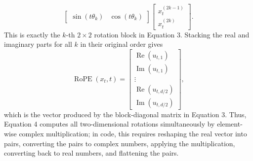 \documentclass[11pt, a4paper, oneside]{article}
\begin{document}
\begin{enumerate}[label=(\alph*), left=0pt, labelsep=1em, itemsep=1em]
\begin{enumerate}[label=\roman*., left=0pt, labelsep=1em, itemsep=1em]
\[\begin{bmatrix}
                \sin(t\theta_k)&\cos(t\theta_k)
            \end{bmatrix}
            \begin{bmatrix}
                x_t^{(2k-1)}\\
                x_t^{(2k)}
            \end{bmatrix}.
        \]
        This is exactly the $k$-th $2\times2$ rotation block in Equation 3.
        Stacking the real and imaginary parts for all $k$ in their original
        order gives
        \[
            \operatorname{RoPE}(x_t,t)
            =
            \begin{bmatrix}
                \operatorname{Re}(u_{t,1})\\
                \operatorname{Im}(u_{t,1})\\
                \vdots\\
                \operatorname{Re}(u_{t,d/2})\\
                \operatorname{Im}(u_{t,d/2})
            \end{bmatrix},
        \]
        which is the vector produced by the block-diagonal matrix in
        Equation 3. Thus, Equation 4 computes all two-dimensional rotations
        simultaneously by element-wise complex multiplication; in code, this
        requires reshaping the real vector into pairs, converting the pairs to
        complex numbers, applying the multiplication, converting back to real
        numbers, and flattening the pairs.


\end{enumerate}
\end{enumerate}
\end{document}
